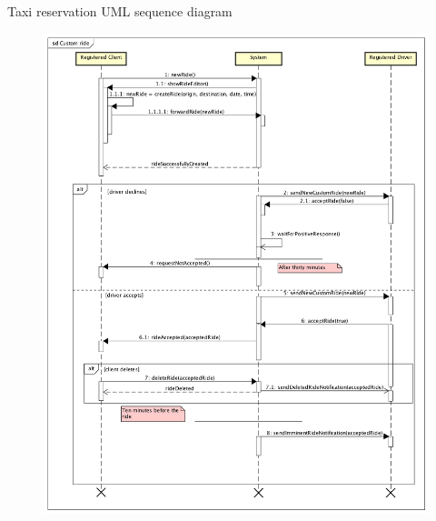 \documentclass[9pt]{beamer}
\begin{document}
\begin{frame}{Taxi reservation UML sequence diagram}
\begin{figure}[H]
\includegraphics[height=0.8\textheight]{Sequence-Client-RideReservation}
\centering
\label{fig:sequenceclientridereservation}
\end{figure}
\end{frame}
\end{document}
